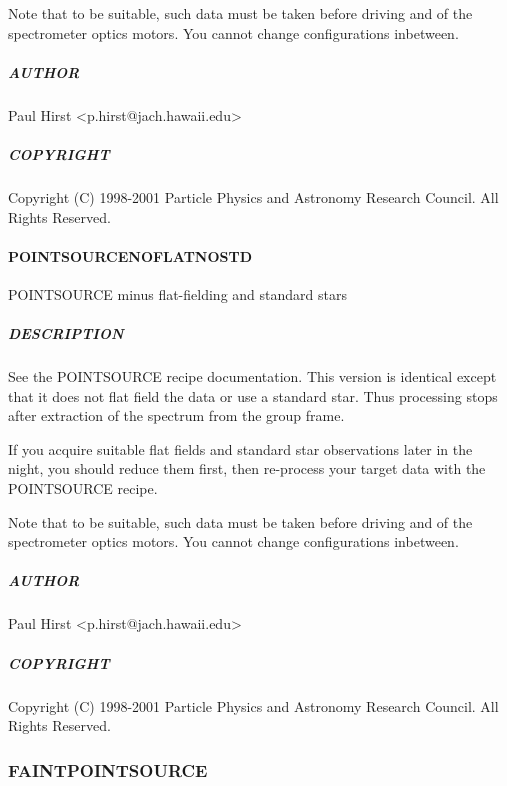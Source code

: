 \documentclass[twoside,11pt]{article}
\renewcommand{\_}{\texttt{\symbol{95}}}
\begin{document}
Note that to be suitable, such data must be taken before driving and
of the spectrometer optics motors. You cannot change configurations
inbetween.

\subparagraph*{AUTHOR\label{POINT_SOURCE_NOSTD_AUTHOR}}

Paul Hirst <p.hirst@jach.hawaii.edu>

\subparagraph*{COPYRIGHT\label{POINT_SOURCE_NOSTD_COPYRIGHT}}

Copyright (C) 1998-2001 Particle Physics and Astronomy Research
Council. All Rights Reserved.

\paragraph*{POINT\_SOURCE\_NOFLAT\_NOSTD\label{POINT_SOURCE_NOFLAT_NOSTD}}

POINT\_SOURCE minus flat-fielding and standard stars

\subparagraph*{DESCRIPTION\label{POINT_SOURCE_NOFLAT_NOSTD_DESCRIPTION}}

See the POINT\_SOURCE recipe documentation. This version is identical
except that it does not flat field the data or use a standard
star. Thus processing stops after extraction of the spectrum from the
group frame.



If you acquire suitable flat fields and standard star observations
later in the night, you should reduce them first, then re-process your
target data with the POINT\_SOURCE recipe.



Note that to be suitable, such data must be taken before driving and
of the spectrometer optics motors. You cannot change configurations
inbetween.

\subparagraph*{AUTHOR\label{POINT_SOURCE_NOFLAT_NOSTD_AUTHOR}}

Paul Hirst <p.hirst@jach.hawaii.edu>

\subparagraph*{COPYRIGHT\label{POINT_SOURCE_NOFLAT_NOSTD_COPYRIGHT}}

Copyright (C) 1998-2001 Particle Physics and Astronomy Research
Council. All Rights Reserved.


\subsubsection{FAINT\_POINT\_SOURCE}
\end{document}
